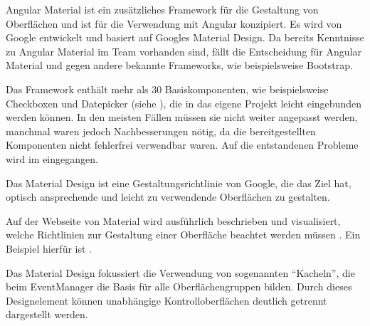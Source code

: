 


Angular Material ist ein zusätzliches Framework für die Gestaltung von Oberflächen und ist für die Verwendung mit Angular konzipiert.
Es wird von Google entwickelt und basiert auf Googles Material Design.
Da bereits Kenntnisse zu Angular Material im Team vorhanden sind, fällt die Entscheidung für Angular Material und gegen andere bekannte Frameworks, wie beispielsweise Bootstrap.

Das Framework enthält mehr als 30 Basiskomponenten, wie beispielsweise Checkboxen und Datepicker (siehe ), die in das eigene Projekt leicht eingebunden werden können. In den meisten Fällen müssen sie nicht weiter angepasst werden, manchmal waren jedoch Nachbesserungen nötig, da die bereitgestellten Komponenten nicht fehlerfrei verwendbar waren. Auf die entstandenen Probleme wird im  eingegangen.



Das Material Design ist eine Gestaltungsrichtlinie von Google, die das Ziel hat, optisch ansprechende und leicht zu verwendende Oberflächen zu gestalten.

Auf der Webseite von Material wird ausführlich beschrieben und visualisiert, welche Richtlinien zur Gestaltung einer Oberfläche beachtet werden müssen \cite{material}. Ein Beispiel hierfür ist .


Das Material Design fokussiert die Verwendung von sogenannten \enquote{Kacheln}, die beim EventManager die Basis für alle Oberflächengruppen bilden. Durch dieses Designelement können unabhängige Kontrolloberflächen deutlich getrennt dargestellt werden.
\newpage

